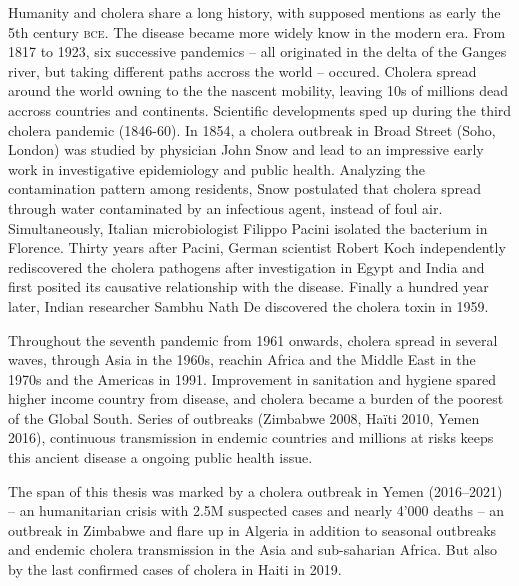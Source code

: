 Humanity and cholera share a long history, with supposed mentions as early the 5th century \textsc{bce}. The disease became more widely know in the modern era. From 1817 to 1923, six successive pandemics -- all originated in the delta of the Ganges river, but taking different paths accross the world -- occured. Cholera spread around the world owning to the the nascent mobility, leaving 10s of millions dead accross countries and continents.  Scientific developments sped up during the third cholera pandemic (1846-60). In 1854, a cholera outbreak in Broad Street (Soho, London) was studied by physician John Snow and lead to an impressive early work in investigative epidemiology and public health. Analyzing the contamination pattern among residents, Snow postulated that cholera spread through water contaminated by an infectious agent, instead of foul air.  Simultaneously, Italian microbiologist Filippo Pacini isolated the bacterium in Florence\cite{Pacini:OsservazioniMicroscopicheDeduzioni:1854}. Thirty years after Pacini, German scientist Robert Koch independently rediscovered the cholera pathogens after investigation in Egypt and India and first posited its causative relationship with the disease. Finally a hundred year later, Indian researcher Sambhu Nath De discovered the cholera toxin in 1959\cite{De:ExperimentalStudyAction:1951}.

Throughout the seventh pandemic from 1961 onwards, cholera spread in several waves, through Asia in the 1960s, reachin Africa and the Middle East in the 1970s and the Americas in 1991\cite{Mutreja:EvidenceSeveralWaves:2011}. Improvement in sanitation and hygiene spared higher income country from disease, and cholera became a burden of the poorest of the Global South. Series of outbreaks (\eg Zimbabwe 2008, Haïti 2010, Yemen 2016), continuous transmission in endemic countries and millions at risks keeps this ancient disease a ongoing public health issue.

The span of this thesis was marked by a cholera outbreak in Yemen (2016--2021) -- an humanitarian crisis with 2.5M suspected cases and nearly 4'000 deaths -- an outbreak in Zimbabwe and flare up in Algeria in addition to seasonal outbreaks and endemic cholera transmission in the Asia and sub-saharian Africa.  But also by the last confirmed cases of cholera in Haiti in 2019.

